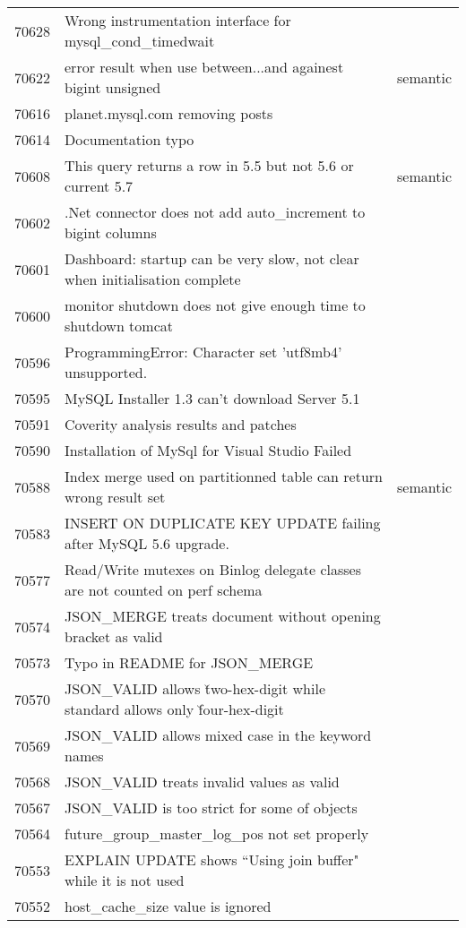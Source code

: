 \begin{longtable}[c]{p{1cm}p{8cm}p{3cm}}
70628 & Wrong instrumentation interface for mysql\_cond\_timedwait &  \\
70622 & error result when use between...and againest bigint unsigned & semantic \\
70616 & planet.mysql.com removing posts &  \\
70614 & Documentation typo &  \\
70608 & This query returns a row in 5.5 but not 5.6 or current 5.7 & semantic \\
70602 & .Net connector does not add auto\_increment to bigint columns &  \\
70601 & Dashboard: startup can be very slow, not clear when initialisation complete &  \\
70600 & monitor shutdown does not give enough time to shutdown tomcat &  \\
70596 & ProgrammingError: Character set 'utf8mb4' unsupported. &  \\
70595 & MySQL Installer 1.3 can't download Server 5.1 &  \\
70591 & Coverity analysis results and patches &  \\
70590 & Installation of MySql for Visual Studio Failed &  \\
70588 & Index merge used on partitionned table can return wrong result set & semantic \\
70583 & INSERT ON DUPLICATE KEY UPDATE failing after MySQL 5.6 upgrade. &  \\
70577 & Read/Write mutexes on Binlog delegate classes are not counted on perf schema &  \\
70574 & JSON\_MERGE treats document without opening bracket as valid &  \\
70573 & Typo in README for JSON\_MERGE &  \\
70570 & JSON\_VALID allows \u two-hex-digit while standard allows only \u four-hex-digit &  \\
70569 & JSON\_VALID allows mixed case in the keyword names &  \\
70568 & JSON\_VALID treats invalid values as valid &  \\
70567 & JSON\_VALID is too strict for some of objects &  \\
70564 & future\_group\_master\_log\_pos not set properly &  \\
70553 & EXPLAIN UPDATE shows ``Using join buffer" while it is not used &  \\
70552 & host\_cache\_size value is ignored &  \\

\end{longtable}
